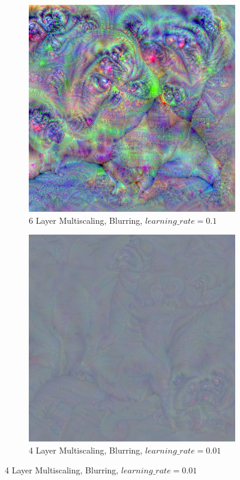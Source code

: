 \begin{figure}
    \captionsetup{justification=centering}

    \begin{subfigure}[t]{0.31\textwidth}
        \captionsetup{justification=centering}
        \centering
        \includegraphics[width=.7\linewidth]{figuras/feat_vis/experiments/classes/cl254/random_image_ci254_lr1e-1_pl6.png}
        \caption{6 Layer Multiscaling, Blurring, \(learning\_rate = 0.1\)}
    \end{subfigure}
    \hfill
    \begin{subfigure}[t]{0.31\textwidth}
        \captionsetup{justification=centering}
        \centering
        \includegraphics[width=.7\linewidth]{figuras/feat_vis/experiments/classes/cl254/random_image_ci254_lr1e-2_pl4.png}
        \caption{4 Layer Multiscaling, Blurring, \(learning\_rate = 0.01\)}

\end{subfigure}
\end{figure}
